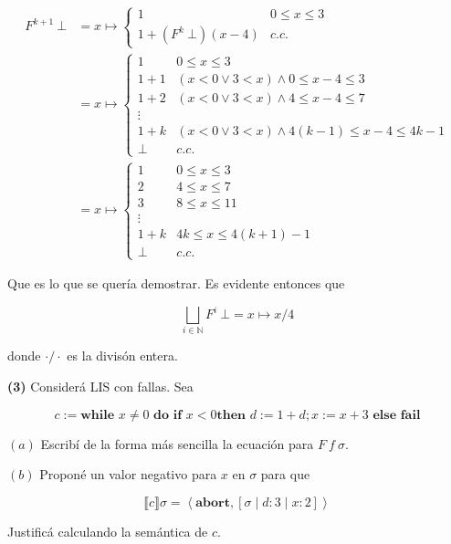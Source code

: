 \documentclass[a4paper, 12pt]{article}
\begin{document}
\begin{align*}
  F^{k+1} ~ \bot  
  &=x\mapsto \begin{cases}
    1 & 0 \leq x \leq 3 \\ 
    1 + (F^k ~ \bot )(x -4) & c.c.
  \end{cases} \\ 
  &=x\mapsto \begin{cases}
    1 & 0 \leq x \leq 3 \\ 
    1 + 1 & (x < 0 \lor  3 < x) \land 0 \leq x-4 \leq 3\\
    1 + 2 & (x < 0 \lor  3 < x) \land 4 \leq x-4 \leq 7\\
    \vdots \\ 
    1 + k & (x < 0 \lor 3 < x) \land 4(k-1) \leq x - 4\leq 4k -1 \\
    \bot &c.c.
  \end{cases} \\ 
  &=x\mapsto \begin{cases}
    1 & 0 \leq x \leq 3 \\ 
    2 & 4 \leq x \leq 7 \\ 
    3 & 8 \leq x \leq 11 \\ 
    \vdots \\ 
    1+k & 4k \leq x \leq 4(k+1) - 1 \\ 
    \bot & c.c.
  \end{cases}
\end{align*}

Que es lo que se quería demostrar. Es evidente entonces que 

\begin{equation*}
  \bigsqcup_{i \in \mathbb{N}} F^i ~ \bot = x \mapsto x / 4
\end{equation*}

donde $\cdot / \cdot$ es la divisón entera.

\pagebreak 

\begin{myframe}
   \textbf{(3)} Considerá LIS con fallas. Sea 

   \begin{equation*}
     c := \textbf{while } x \neq 0 \textbf{ do } \textbf{if } x < 0 \textbf{
     then } d := 1 + d ; x := x + 3 \textbf{ else } \textbf{fail}
   \end{equation*}


  $(a)$ Escribí de la forma más sencilla la ecuación para $F ~ f ~ \sigma$. 

  $(b)$ Proponé un valor negativo para $x$ en $\sigma$ para que 

  \begin{equation*}
    \llbracket c \rrbracket\sigma = \left<\textbf{abort}, [\sigma \mid d : 3
    \mid x : 2] \right>
  \end{equation*} 

  Justificá calculando la semántica de $c$.
\end{myframe}
\end{document}
